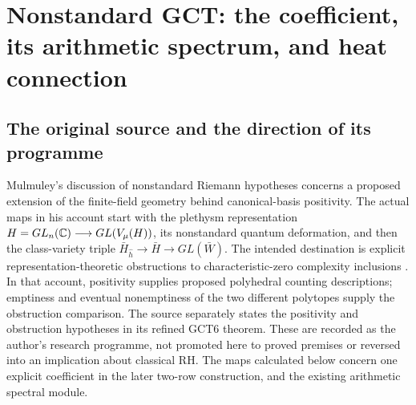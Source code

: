 \section[Nonstandard GCT: coefficient, spectrum and heat connection]{Nonstandard GCT: the coefficient, its arithmetic spectrum, and heat connection}
\label{sec:gct-arithmetic-spectrum}

\subsection{The original source and the direction of its programme}
Mulmuley's discussion of nonstandard Riemann hypotheses concerns a proposed
extension of the finite-field geometry behind canonical-basis positivity.
The actual maps in his account start with the plethysm representation
$H=GL_n(\mathbb C)\longrightarrow GL(V_\mu(H))$, its nonstandard quantum
deformation, and then the class-variety triple
$\bar H_{\hat h}\longrightarrow\bar H\longrightarrow GL(\bar W)$.
The intended destination is explicit representation-theoretic obstructions
to characteristic-zero complexity inclusions
\cite[section ``How to prove PH1 and why should it hold?'']{mulmuley2009gct}.
In that account, positivity supplies proposed polyhedral counting
descriptions; emptiness and eventual nonemptiness of the two different
polytopes supply the obstruction comparison. The source separately states
the positivity and obstruction hypotheses in its refined GCT6 theorem.
These are recorded as the author's research programme, not promoted here
to proved premises or reversed into an implication about classical RH.
The maps calculated below concern one explicit coefficient in the later
two-row construction, and the existing arithmetic spectral module.


